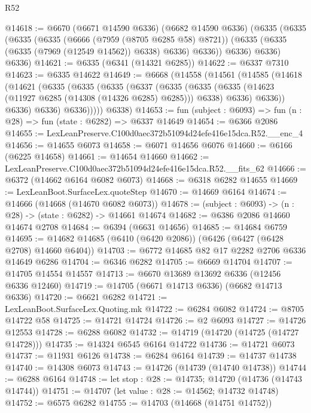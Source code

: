 \begin{lexlean}{R52}
\begin{coremodule}
@14618 := @6670
    (@6671 @14590 @6336)
    (@6682 @14590 @6336)
    (@6335
      (@6335
        (@6335
          (@6335
            (@6666 (@7959 (@8705 @6285 @58) @8721))
            (@6335 (@6335 (@6335 (@7969 (@12549 @14562)) @6338) @6336) @6336))
          @6336)
        @6336)
      @6336)
@14621 := @6335 (@6341 (@14321 @6285))
@14622 := @6337 @7310
@14623 := @6335 @14622
@14649 := @6668
    (@14558
      (@14561
        (@14585
          (@14618
            (@14621
              (@6335
                (@6335
                  (@6335
                    (@6337
                      (@6335
                        (@6335
                          (@6335 (@14623 (@11927 @6285 (@14308 (@14326 @6285) @6285))) @6338)
                          @6336)
                        @6336))
                    @6336)
                  @6336)
                @6336)))))
      @6338)
@14653 := fun (subject : @6093) => fun (n : @28) => fun (state : @6282) => @6337 @14649
@14654 := @6366 @2086
@14655 := LexLeanPreserve.C100d0aec372b51094d24efe416e15dca.R52.__enc_4
@14656 := @14655 @6073
@14658 := @6071 @14656 @6076
@14660 := @6166 (@6225 @14658)
@14661 := @14654 @14660
@14662 := LexLeanPreserve.C100d0aec372b51094d24efe416e15dca.R52.__fits_62
@14666 := @6372 (@14662 @6164 @6082 @6073)
@14668 := @6318 @6282 @14655
@14669 := LexLeanBoot.SurfaceLex.quoteStep
@14670 := @14669 @6164
@14674 := @14666 (@14668 (@14670 @6082 @6073))
@14678 := (subject : @6093) -> (n : @28) -> (state : @6282) -> @14661 @14674
@14682 := @6386 @2086 @14660 @14674 @2708
@14684 := @6394 (@6631 @14656)
@14685 := @14684 @6759
@14695 := @14682 @14685 (@6410 (@6420 @2086)) (@6426 (@6427 (@6428 @2708) @14660 @6404))
@14703 := @6772 @14685 @82 @17 @2282 @2706 @6336 @14649 @6286
@14704 := @6346 @6282
@14705 := @6669 @14704
@14707 := @14705 @14554 @14557
@14713 := @6670 @13689 @13692 @6336 (@12456 @6336 @12460)
@14719 := @14705 (@6671 @14713 @6336) (@6682 @14713 @6336)
@14720 := @6621 @6282
@14721 := LexLeanBoot.SurfaceLex.Quoting.mk
@14722 := @6284 @6082
@14724 := @8705 @14722 @58
@14725 := @14721 @14724
@14726 := @2 @6093
@14727 := @14726 @12553
@14728 := @6288 @6082
@14732 := @14719 (@14720 (@14725 (@14727 @14728)))
@14735 := @14324 @6545 @6164 @14722
@14736 := @14721 @6073
@14737 := @11931 @6126
@14738 := @6284 @6164
@14739 := @14737 @14738
@14740 := @14308 @6073
@14743 := @14726 (@14739 (@14740 @14738))
@14744 := @6288 @6164
@14748 := let stop : @28 := @14735; @14720 (@14736 (@14743 @14744))
@14751 := @14707 (let value : @28 := @14562; @14732 @14748)
@14752 := @6575 @6282
@14755 := @14703 (@14668 (@14751 @14752))

\end{coremodule}
\end{lexlean}
